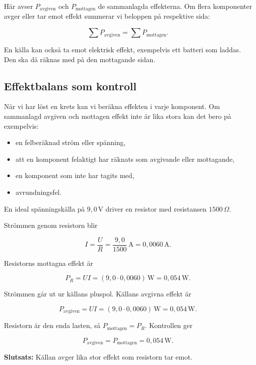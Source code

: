 \documentclass[
  swedish,
  11pt,
  a4paper,
  DIV=11,
  numbers=noendperiod,
  twoside,
  open=any]{scrreprt}
\providecommand{\tightlist}{%
  \setlength{\itemsep}{0pt}\setlength{\parskip}{0pt}}
\begin{document}
Här avser \(P_\mathrm{avgiven}\) och \(P_\mathrm{mottagen}\) de
sammanlagda effekterna. Om flera komponenter avger eller tar emot effekt
summerar vi beloppen på respektive sida:

\[
\boxed{\sum P_\mathrm{avgiven} = \sum P_\mathrm{mottagen}}.
\]

En källa kan också ta emot elektrisk effekt, exempelvis ett batteri som
laddas. Den ska då räknas med på den mottagande sidan.

\subsection{Effektbalans som
kontroll}\label{sec-effekt-effektbalans-som-kontroll}

När vi har löst en krets kan vi beräkna effekten i varje komponent. Om
sammanlagd avgiven och mottagen effekt inte är lika stora kan det bero
på exempelvis:

\begin{itemize}
\tightlist
\item
  en felberäknad ström eller spänning,
\item
  att en komponent felaktigt har räknats som avgivande eller mottagande,
\item
  en komponent som inte har tagits med,
\item
  avrundningsfel.
\end{itemize}

\begin{tcolorbox}[enhanced jigsaw, arc=.35mm, bottomrule=.15mm, bottomtitle=1mm, breakable, colback=white, colbacktitle=quarto-callout-note-color!10!white, colframe=quarto-callout-note-color-frame, coltitle=black, left=2mm, leftrule=.75mm, opacityback=0, opacitybacktitle=0.6, rightrule=.15mm, title={Exempel: kontroll med effektbalans}, titlerule=0mm, toprule=.15mm, toptitle=1mm]

En ideal spänningskälla på \(9{,}0\,\mathrm{V}\) driver en resistor med
resistansen \(1500\,\Omega\).

Strömmen genom resistorn blir

\[
I = \frac{U}{R}
= \frac{9{,}0}{1500}\,\mathrm{A}
= 0{,}0060\,\mathrm{A}.
\]

Resistorns mottagna effekt är

\[
P_R = UI
= (9{,}0 \cdot 0{,}0060)\,\mathrm{W}
= 0{,}054\,\mathrm{W}.
\]

Strömmen går ut ur källans pluspol. Källans avgivna effekt är

\[
P_\mathrm{avgiven} = UI
= (9{,}0 \cdot 0{,}0060)\,\mathrm{W}
= 0{,}054\,\mathrm{W}.
\]

Resistorn är den enda lasten, så \(P_\mathrm{mottagen} = P_R\).
Kontrollen ger

\[
P_\mathrm{avgiven} = P_\mathrm{mottagen}
= 0{,}054\,\mathrm{W}.
\]

\textbf{Slutsats:} Källan avger lika stor effekt som resistorn tar emot.

\end{tcolorbox}
\end{document}
